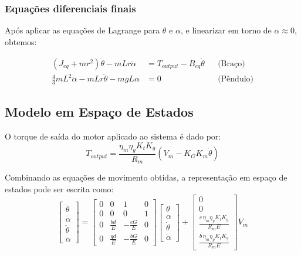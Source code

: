 \documentclass[9pt,a4paper,twocolumn,twoside]{tau-class/tau}
\begin{document}
\subsubsection*{Equações diferenciais finais}

Após aplicar as equações de Lagrange para $\theta$ e $\alpha$, e linearizar em torno de $\alpha \approx 0$, obtemos:

\begin{align}
    (J_{eq} + m r^2)\ddot{\theta} - m L r \ddot{\alpha} &= T_{output} - B_{eq}\dot{\theta} 
    && \text{(Braço)} \\
    \tfrac{4}{3} m L^2 \ddot{\alpha} - m L r \ddot{\theta} - m g L \alpha &= 0
    && \text{(Pêndulo)}
\end{align}



\subsection{Modelo em Espaço de Estados}

O torque de saída do motor aplicado ao sistema é dado por:
\begin{equation}
    T_{output} = \frac{\eta_m \eta_g K_t K_g}{R_m} \left( V_m - K_G K_m \dot{\theta} \right) 
    \tag{26}
\end{equation}

Combinando as equações de movimento obtidas, a representação em espaço de estados pode ser escrita como:
\begin{equation}
\begin{bmatrix}
\dot{\theta} \\
\dot{\alpha} \\
\ddot{\theta} \\
\ddot{\alpha}
\end{bmatrix}
=
\begin{bmatrix}
0 & 0 & 1 & 0 \\
0 & 0 & 0 & 1 \\
0 & \tfrac{bd}{E} & -\tfrac{cG}{E} & 0 \\
0 & \tfrac{qd}{E} & -\tfrac{bG}{E} & 0
\end{bmatrix}
\begin{bmatrix}
\theta \\ \alpha \\ \dot{\theta} \\ \dot{\alpha}
\end{bmatrix}
+
\begin{bmatrix}
0 \\
0 \\
\tfrac{c \, \eta_m \eta_g K_t K_g}{R_m E} \\
\tfrac{b \, \eta_m \eta_g K_t K_g}{R_m E}
\end{bmatrix} V_m
\tag{27}
\end{equation}
\end{document}
